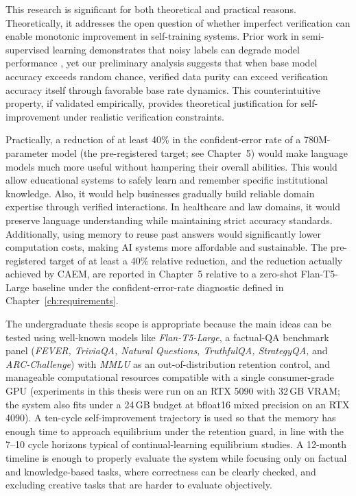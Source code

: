 This research is significant for both theoretical and practical reasons. Theoretically, it addresses the open question of whether imperfect verification can enable monotonic improvement in self-training systems. Prior work in semi-supervised learning demonstrates that noisy labels can degrade model performance \cite{natarajan2013learning}, yet our preliminary analysis suggests that when base model accuracy exceeds random chance, verified data purity can exceed verification accuracy itself through favorable base rate dynamics. This counterintuitive property, if validated empirically, provides theoretical justification for self-improvement under realistic verification constraints.

Practically, a reduction of at least 40\% in the confident-error rate of a 780M-parameter model (the pre-registered target; see Chapter~5) would make language models much more useful without hampering their overall abilities. This would allow educational systems to safely learn and remember specific institutional knowledge. Also, it would help businesses gradually build reliable domain expertise through verified interactions. In healthcare and law domains, it would preserve language understanding while maintaining strict accuracy standards. Additionally, using memory to reuse past answers would significantly lower computation costs, making AI systems more affordable and sustainable. The pre-registered target of at least a 40\% relative reduction, and the reduction actually achieved by CAEM, are reported in Chapter~5 relative to a zero-shot Flan-T5-Large baseline under the confident-error-rate diagnostic defined in Chapter~\ref{ch:requirements}.

The undergraduate thesis scope is appropriate because the main ideas can be tested using well-known models like \textit{Flan-T5-Large}, a factual-QA benchmark panel (\textit{FEVER, TriviaQA, Natural Questions, TruthfulQA, StrategyQA,} and \textit{ARC-Challenge}) with \textit{MMLU} as an out-of-distribution retention control, and manageable computational resources compatible with a single consumer-grade GPU (experiments in this thesis were run on an RTX 5090 with 32\,GB VRAM; the system also fits under a 24\,GB budget at bfloat16 mixed precision on an RTX 4090). A ten-cycle self-improvement trajectory is used so that the memory has enough time to approach equilibrium under the retention guard, in line with the 7--10 cycle horizons typical of continual-learning equilibrium studies. A 12-month timeline is enough to properly evaluate the system while focusing only on factual and knowledge-based tasks, where correctness can be clearly checked, and excluding creative tasks that are harder to evaluate objectively.

